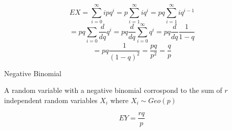 \documentclass{report}
\begin{document}
\begin{description}
\begin{mdframed}
            \begin{displaymath}
                EX = \sum_{i = 0}^{\infty} ipq^i
                = p \sum_{i = 1}^{\infty} iq^i
                = pq \sum_{i = 1}^{\infty}iq^{i-1}
            \end{displaymath}
            \begin{displaymath}
             = pq \sum_{i = 0} \frac{d}{dq} q^{i}
             = pq \frac{d}{dq} \sum_{i=0}^{\infty} q^i
             = pq \frac{d}{dq} \frac{1}{1-q}
            \end{displaymath}
            \begin{displaymath}
                = pq \frac{1}{(1-q)^2}
                = \frac{pq}{p^2}
                = \frac{q}{p}
            \end{displaymath}
        \end{mdframed}
    \item {\large Negative Binomial}
        \begin{mdframed}
            A random variable with a negative binomial
            corrospond to the sum of $r$ independent random
            variables  $X_i$ where  $X_i \sim Geo(p)$ 

             \begin{displaymath}
                 EY = \frac{rq}{p}
            \end{displaymath}
            
        \end{mdframed}
    \item {\large}
\end{description}
\end{document}

